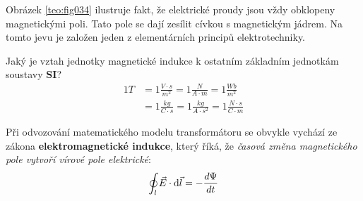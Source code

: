     Obrázek \ref{teo:fig034} ilustruje fakt, že elektrické proudy jsou vždy obklopeny 
    magnetickými poli. Tato pole se dají zesílit cívkou s magnetickým jádrem. Na tomto jevu je 
    založen jeden z elementárních principů elektrotechniky.    
       
    \begin{mdframed}[style=mdnote]
      Jaký je vztah jednotky magnetické indukce k ostatním základním jednotkám soustavy \textbf{SI}? 
      \begin{align*}
      1T &= 1\frac{V\cdot s}{m^2} = 1\frac{N}{A\cdot m} = 1\frac{Wb}{m^2}          \\
         &= 1\frac{kg}{C\cdot s} = 1\frac{kg}{A\cdot s^2} = 1\frac{N\cdot s}{C \cdot m}
      \end{align*}
    \end{mdframed}
    
    Při odvozování matematického modelu transformátoru se obvykle vychází ze zákona 
    \textbf{elektromagnetické indukce}, který říká, že \emph{časová změna magnetického pole vytvoří 
    vírové pole elektrické}:
    \begin{equation}\label{es:eq_ind_z}
      \oint_l \vec{E} \cdot \mathop{}\!\mathrm{d}\vec{l} = - \dfrac{d \Psi}{d t}
    \end{equation}
     
